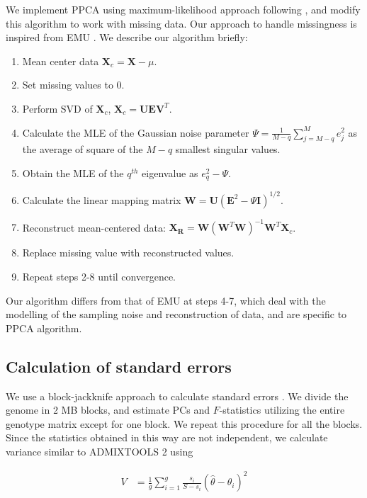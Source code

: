 \documentclass[12pt]{article}
\newcommand{\BW}{\mathbf{W}}
\newcommand{\BI}{\mathbf{I}}
\newcommand{\MX}{\mathbf{X}}
\begin{document}
We implement PPCA using maximum-likelihood approach following \cite{tipping_probabilistic_1999-1}, and modify this algorithm to work with missing data. Our approach to handle missingness is inspired from EMU \citep{meisner_large-scale_2021}. We describe our algorithm briefly:
\begin{enumerate}
    \item Mean center data $\MX_c = \MX - \mu$.
    \item Set missing values to 0.
    \item Perform SVD of $\MX_c$, $\MX_c = \mathbf{UEV}^T$.
    \item Calculate the MLE of the Gaussian noise parameter $\Psi = \frac{1}{M-q} \sum_{j=M-q}^ M e_j^2$ as the average of square of the $M-q$ smallest singular values.
    \item Obtain the MLE of the $q^{th}$ eigenvalue as $e_q^2 - \Psi$.
    \item Calculate the linear mapping matrix $\BW = \mathbf{U} (\mathbf{E}^2 - \Psi\BI)^{1/2}$.
    \item Reconstruct mean-centered data: $\mathbf{X_R} = \BW(\BW^T\BW)^{-1}\BW^T\MX_c$.
    \item Replace missing value with reconstructed values.
    \item Repeat steps 2-8 until convergence.
\end{enumerate}

Our algorithm differs from that of EMU at steps 4-7, which deal with the modelling of the sampling noise and reconstruction of data, and are specific to PPCA algorithm.

\subsection{Calculation of standard errors}

We use a block-jackknife approach to calculate standard errors \citep{kunsch_jackknife_1989, maier_limits_2022, patterson_modication_2020}. We divide the genome in 2 MB blocks, and estimate PCs and $F$-statistics utilizing the entire genotype matrix except for one block. We repeat this procedure for all the blocks. Since the statistics obtained in this way are not independent, we calculate variance similar to ADMIXTOOLS 2 using 

\begin{align}\label{eq:bjk_var}
V &= \frac{1}{g} \sum_{i=1}^g \frac{s_i}{S-s_i} (\hat{\theta} - \theta_i)^2
\end{align}
\end{document}
